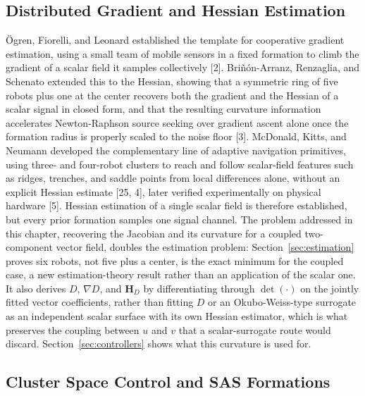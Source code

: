 \documentclass[12pt, letterpaper, oneside]{report}
\begin{document}
\subsection{Distributed Gradient and Hessian Estimation}

Ögren, Fiorelli, and Leonard established the template for cooperative
gradient estimation, using a small team of mobile sensors in a fixed
formation to climb the gradient of a scalar field it samples collectively
[2]. Briñón-Arranz, Renzaglia, and Schenato extended this to the Hessian,
showing that a symmetric ring of five robots plus one at the center
recovers both the gradient and the Hessian of a scalar signal in closed
form, and that the resulting curvature information accelerates
Newton-Raphson source seeking over gradient ascent alone once the formation
radius is properly scaled to the noise floor [3]. McDonald, Kitts, and
Neumann developed the complementary line of adaptive navigation primitives,
using three- and four-robot clusters to reach and follow scalar-field
features such as ridges, trenches, and saddle points from local differences
alone, without an explicit Hessian estimate [25, 4], later verified
experimentally on physical hardware [5]. Hessian estimation of a single
scalar field is therefore established, but every prior formation samples
one signal channel. The problem addressed in this chapter, recovering the
Jacobian and its curvature for a coupled two-component vector field,
doubles the estimation problem: Section~\ref{sec:estimation} proves six
robots, not five plus a center, is the exact minimum for the coupled case,
a new estimation-theory result rather than an application of the scalar
one. It also derives $D$, $\nabla D$, and $\mathbf{H}_D$ by differentiating
through $\det(\cdot)$ on the jointly fitted vector coefficients, rather
than fitting $D$ or an Okubo-Weiss-type surrogate as an independent scalar
surface with its own Hessian estimator, which is what preserves the
coupling between $u$ and $v$ that a scalar-surrogate route would discard.
Section~\ref{sec:controllers} shows what this curvature is used for.

\subsection{Cluster Space Control and SAS Formations}
\end{document}
